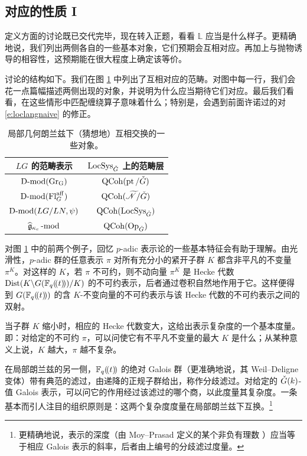 \subsection{对应的性质 I}

\ssszh 定义方面的讨论既已交代完毕，现在转入正题，看看 $\mathbb{L}$ 应当是什么样子。更精确地说，我们列出两侧各自的一些基本对象，它们预期会互相对应。再加上与抛物诱导的相容性，这预期能在很大程度上确定该等价。

讨论的结构如下。我们在图 \ref{f:table} 中列出了互相对应的范畴。对图中每一行，我们会花一点篇幅描述两侧出现的对象，并说明为什么应当期待它们对应。最后我们看看，在这些情形中匹配缠绕算子意味着什么；特别是，会遇到前面许诺过的对 \eqref{e:loclangnaive} 的修正。



\begin{table}[htbp]
\centering
\begin{tabular}{|c|c|}
\hline
$LG$ 的范畴表示 & $\operatorname{LocSys}_{\check{G}}$ 上的范畴层 \\
\hline
$\operatorname{D-mod}(\operatorname{Gr_G})$ & $\operatorname{QCoh}( \operatorname{pt}/\check{G})$ \\
$\operatorname{D-mod}(\operatorname{Fl}^{\operatorname{aff}}_G)$ & $\operatorname{QCoh}( \widetilde{{\mathscr{N}}}/\check{G})$ \\
$\operatorname{D-mod}(LG/LN, \psi)$ & $\operatorname{QCoh}(\operatorname{LocSys}_{\check{G}})$ \\
$\widehat{\mathfrak{g}}_{\kappa_c}\operatorname{-mod}$ & $\operatorname{QCoh}(\mathrm{Op}_{\check{G}})$ \\
\hline
\end{tabular}
\caption{局部几何朗兰兹下（猜想地）互相交换的一些对象。}
\label{f:table}
\end{table}


\ssszh 对图 \ref{f:table} 中的前两个例子，回忆 $p$-adic 表示论的一些基本特征会有助于理解。由光滑性，$p$-adic 群的任意表示 $\pi$ 对所有充分小的紧开子群 $K$ 都含非平凡的不变量 $\pi^K$。对这样的 $K$，若 $\pi$ 不可约，则不动向量 $\pi^K$ 是 Hecke 代数 $\operatorname{Dist}(K \backslash G(\mathbb{F}_q(\!(t)\!)) / K)$ 的不可约表示，后者通过卷积自然地作用于它。这样便得到 $G(\mathbb{F}_q(\!(t)\!))$ 的含 $K$-不变向量的不可约表示与该 Hecke 代数的不可约表示之间的双射。

当子群 $K$ 缩小时，相应的 Hecke 代数变大，这给出表示复杂度的一个基本度量。即：对给定的不可约 $\pi$，可以问使它有不平凡不变量的最大 $K$ 是什么；从某种意义上说，$K$ 越大，$\pi$ 越不复杂。


在局部朗兰兹的另一侧，$\mathbb{F}_q(\!(t)\!)$ 的绝对 Galois 群（更准确地说，其 Weil--Deligne 变体）带有典范的滤过，由递降的正规子群给出，称作分歧滤过。对给定的 $\check{G}(k)$-值 Galois 表示，可以问它的作用经过该滤过的哪个商，以此度量其复杂度。一条基本而引人注目的组织原则是：这两个复杂度度量在局部朗兰兹下互换。\footnote{更精确地说，表示的深度（由 Moy--Prasad 定义的某个非负有理数 \cite{moyprasad}）应当等于相应 Galois 表示的斜率，后者由上编号的分歧滤过度量。}


